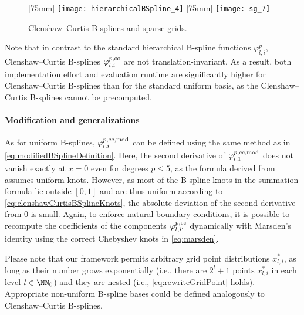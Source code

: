 \begin{figure}
  [75mm]{%
    \texttt{[image: hierarchicalBSpline\_4]}%
  }%
  \hfill%
  [75mm]{%
    \texttt{[image: sg\_7]}%
  }%
  \caption{%
    Clenshaw--Curtis B-splines and sparse grids.%
  }
  \label{fig:clenshawCurtis}
\end{figure}

Note that in contrast to the standard hierarchical B-spline functions
$\varphi_{l,i}^p$, Clenshaw--Curtis B-splines
$\varphi_{l,i}^{p,\mathrm{cc}}$ are not translation-invariant.
As a result, both implementation effort and evaluation runtime
are significantly higher for Clenshaw--Curtis B-splines than
for the standard uniform basis,
as the Clenshaw--Curtis B-splines cannot be precomputed.

\paragraph{Modification and generalizations}

As for uniform B-splines,
$\varphi_{l,i}^{p,\mathrm{cc},\mathrm{mod}}$ can be defined using the
same method as in \eqref{eq:modifiedBSplineDefinition}.
Here, the second derivative of $\varphi_{l,1}^{p,\mathrm{cc},\mathrm{mod}}$
does not vanish exactly at $x = 0$ even for degrees $p \le 5$,
as the formula derived from  assumes uniform knots.
However, as most of the B-spline knots in the summation formula
lie outside $[0, 1]$ and are thus uniform according
to \eqref{eq:clenshawCurtisBSplineKnots},
the absolute deviation of the second derivative from $0$ is small.
Again, to enforce natural boundary conditions,
it is possible to recompute the coefficients
of the components $\varphi_{l,i'}^{p,\mathrm{cc}}$
dynamically with Marsden's identity using the correct Chebyshev knots
in \eqref{eq:marsden}.

Please note that our framework permits arbitrary grid point distributions
$x_{l,i}^\ast$,
as long as their number grows exponentially
(i.e., there are $2^l + 1$ points $x_{l,i}^\ast$ in each level $l \in \NN_0$)
and they are nested
(i.e., \eqref{eq:rewriteGridPoint} holds).
Appropriate non-uniform B-spline bases could be defined analogously
to Clenshaw--Curtis B-splines.
